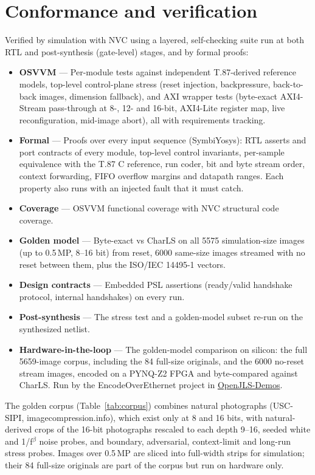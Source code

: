 \documentclass[10pt,a4paper]{article}
\begin{document}
\section{Conformance and verification}
Verified by simulation with NVC using a layered, self-checking suite run at
both RTL and post-synthesis (gate-level) stages, and by formal proofs:
\begin{itemize}
  \item \textbf{OSVVM} --- Per-module tests against independent T.87-derived
        reference models, top-level control-plane stress (reset injection,
        backpressure, back-to-back images, dimension fallback), and AXI wrapper
        tests (byte-exact AXI4-Stream pass-through at 8-, 12- and 16-bit, AXI4-Lite
        register map, live reconfiguration, mid-image abort), all with
        requirements tracking.
  \item \textbf{Formal} --- Proofs over every input sequence (SymbiYosys): RTL
        asserts and port contracts of every module, top-level control invariants,
        per-sample equivalence with the T.87 C reference, run coder, bit and byte
        stream order, context forwarding, FIFO overflow margins and datapath ranges.
        Each property also runs with an injected fault that it must catch.
  \item \textbf{Coverage} --- OSVVM functional coverage with NVC structural code coverage.
  \item \textbf{Golden model} --- Byte-exact vs CharLS on all 5575
        simulation-size images (up to 0.5\,MP, 8--16 bit) from reset, 6000 same-size
        images streamed with no reset between them, plus the ISO/IEC 14495-1 vectors.
  \item \textbf{Design contracts} --- Embedded PSL assertions (ready/valid handshake protocol, internal handshakes) on every run.
  \item \textbf{Post-synthesis} --- The stress test and a golden-model subset re-run on the synthesized netlist.
  \item \textbf{Hardware-in-the-loop} --- The golden-model comparison on silicon: the full 5659-image corpus, including the 84 full-size originals, and the 6000 no-reset stream images, encoded on a PYNQ-Z2 FPGA and byte-compared against CharLS. Run by the EncodeOverEthernet project in \href{https://github.com/isentropic-fpga/OpenJLS-Demos}{OpenJLS-Demos}.
\end{itemize}

\noindent The golden corpus (Table~\ref{tab:corpus}) combines natural photographs
(USC-SIPI, imagecompression.info), which exist only at 8 and 16 bits,
with natural-derived crops of the 16-bit photographs rescaled to each depth
9--16, seeded white and 1/f$^\beta$ noise probes, and boundary, adversarial,
context-limit and long-run stress probes. Images over 0.5\,MP are sliced into full-width strips for
simulation; their 84 full-size originals are part of the corpus but run on hardware only.
\end{document}
